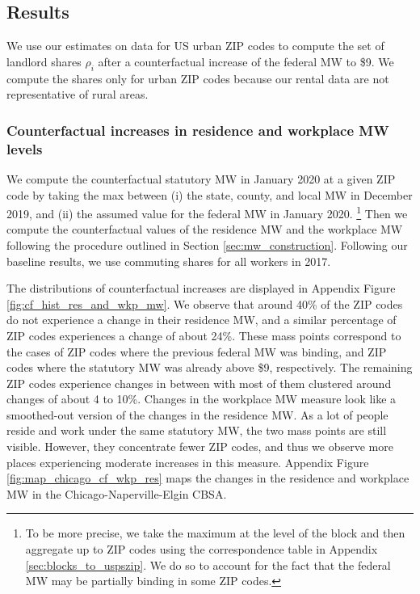 \subsection{Results}\label{sec:results_cf}

We use our estimates on data for US urban ZIP codes to compute the set of
landlord shares ${\rho_i}$ after a counterfactual increase of the federal 
MW to \$9.
We compute the shares only for urban ZIP codes because our rental data are not 
representative of rural areas.

\subsubsection*{Counterfactual increases in residence and workplace MW levels}
\label{sec:cf_res_and_wkp_changes}

We compute the counterfactual statutory MW in January 2020 at a given ZIP code 
by taking the max between (i) the state, county, and local MW in December 2019, 
and (ii) the assumed value for the federal MW in January 2020.%
\footnote{To be more precise, we take the maximum at the level of the block and 
then aggregate up to ZIP codes using the correspondence table in Appendix 
\ref{sec:blocks_to_uspszip}.
We do so to account for the fact that the federal MW may be partially binding
in some ZIP codes.}
Then we compute the counterfactual values of the residence MW and the workplace
MW following the procedure outlined in Section \ref{sec:mw_construction}.
Following our baseline results, we use commuting shares for all workers in
2017.

The distributions of counterfactual increases are displayed in Appendix
Figure \ref{fig:cf_hist_res_and_wkp_mw}.
We observe that around 40\% of the ZIP codes do not experience a change 
in their residence MW, and a similar percentage of ZIP codes experiences a
change of about 24\%.
These mass points correspond to the cases of ZIP codes where the previous 
federal MW was binding, and ZIP codes where the statutory MW was already 
above \$9, respectively.
The remaining ZIP codes experience changes in between with most of them
clustered around changes of about 4 to 10\%.
Changes in the workplace MW measure look like a smoothed-out version of
the changes in the residence MW.
As a lot of people reside and work under the same statutory MW, the two mass
points are still visible.
However, they concentrate fewer ZIP codes, and thus we observe more places 
experiencing moderate increases in this measure.
Appendix Figure \ref{fig:map_chicago_cf_wkp_res} maps the changes in the 
residence and workplace MW in the Chicago-Naperville-Elgin CBSA.

